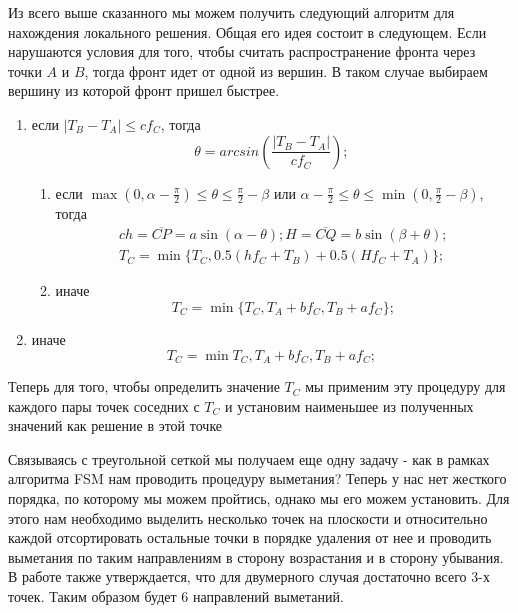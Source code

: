 \documentclass[a4paper,12pt]{article}
\begin{document}
Из всего выше сказанного мы можем получить следующий алгоритм для
нахождения локального решения. Общая его идея состоит в
следующем. Если нарушаются условия для того, чтобы считать
распространение фронта через точки $A$ и $B$, тогда фронт идет от
одной из вершин. В таком случае выбираем вершину из которой фронт
пришел быстрее.

\begin{enumerate}
\item если $|T_B-T_A| \le c f_C$, тогда
  \begin{equation*}
    \theta = arcsin \left(\frac{|T_B-T_A|}{c f_C}\right);
  \end{equation*}
  \begin{enumerate}
  \item если $\max (0,\alpha - \frac{\pi}{2}) \le \theta \le
    \frac{\pi}{2} - \beta$ или $\alpha - \frac{\pi}{2} \le \theta \le
    \min(0, \frac{\pi}{2} - \beta)$, тогда
    \begin{equation*}
      \begin{aligned}{c}
        h = \overline{CP} = a \sin(\alpha - \theta); H =
        \overline{CQ}=
        b \sin (\beta + \theta);\\
        T_C = \min\{T_C,0.5(h f_C + T_B)+0.5(H f_C + T_A)\};
      \end{aligned}
    \end{equation*}
  \item иначе
    \begin{equation*}
      T_C = \min\{T_C,T_A+b f_C, T_B + a f_C\};
    \end{equation*}
  \end{enumerate}
\item иначе
  \begin{equation*}
    T_C = \min{T_C,T_A+b f_C, T_B + a f_C};
  \end{equation*}

\end{enumerate}

Теперь для того, чтобы определить значение $T_C$ мы применим эту
процедуру для каждого пары точек соседних с $T_C$ и установим
наименьшее из полученных значений как решение в этой точке

Связываясь с треугольной сеткой мы получаем еще одну задачу - как в
рамках алгоритма FSM нам проводить процедуру выметания? Теперь у нас
нет жесткого порядка, по которому мы можем пройтись, однако мы его
можем установить. Для этого нам необходимо выделить несколько точек на
плоскости и относительно каждой  отсортировать остальные точки в порядке
удаления от нее и проводить выметания по таким направлениям в сторону
возрастания и в сторону убывания. В работе \cite{FS2007} также
утверждается, что для двумерного случая достаточно всего 3-х
точек. Таким образом будет 6 направлений выметаний.
\end{document}
